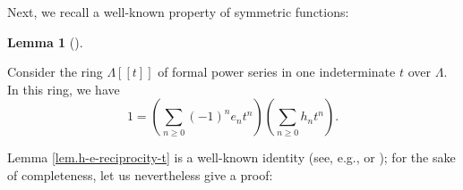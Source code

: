 \documentclass[numbers=enddot,12pt,final,onecolumn,notitlepage]{scrartcl}%
\theoremstyle{definition}
\newtheorem{lem}[theo]{Lemma}
\newenvironment{lemma}[1][]
{\begin{lem}[#1]\begin{leftbar}}
{\end{leftbar}\end{lem}}
\let\sumnonlimits\sum
\renewcommand{\sum}{\sumnonlimits\limits}
\begin{document}
Next, we recall a well-known property of symmetric functions:

\begin{lemma}
\label{lem.h-e-reciprocity-t}Consider the ring $\Lambda\left[  \left[
t\right]  \right]  $ of formal power series in one indeterminate $t$ over
$\Lambda$. In this ring, we have%
\begin{equation}
1=\left(  \sum_{n\geq0}\left(  -1\right)  ^{n}e_{n}t^{n}\right)  \left(
\sum_{n\geq0}h_{n}t^{n}\right)  . \label{pf.thm.petk.explicit.aker.pf.1}%
\end{equation}

\end{lemma}

Lemma \ref{lem.h-e-reciprocity-t} is a well-known identity (see, e.g.,
\cite[proof of Theorem 7.6.1]{Stanley-EC2} or \cite[(2.4.3)]{GriRei}); for the
sake of completeness, let us nevertheless give a proof:
\end{document}
